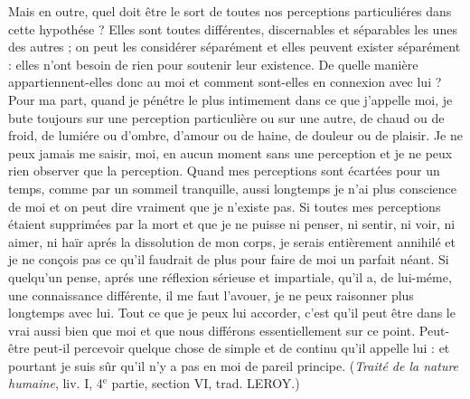 Mais en outre, quel doit être le sort de toutes nos perceptions
particuliéres dans cette hypothése ? Elles sont
toutes différentes, discernables et séparables les unes des
autres ; on peut les considérer séparément et elles peuvent
exister séparément : elles n’ont besoin de rien pour soutenir
leur existence. De quelle manière appartiennent-elles donc
au moi et comment sont-elles en connexion avec lui ?
Pour ma part, quand je pénétre le plus intimement dans
ce que j’appelle moi, je bute toujours sur une perception
particulière ou sur une autre, de chaud ou de froid, de
lumiére ou d’ombre, d’amour ou de haine, de douleur ou
de plaisir. Je ne peux jamais me saisir, moi, en aucun
moment sans une perception et je ne peux rien observer
que la perception. Quand mes perceptions sont écartées
pour un temps, comme par un sommeil tranquille, aussi
longtemps je n’ai plus conscience de moi et on peut dire
vraiment que je n’existe pas. Si toutes mes perceptions
étaient supprimées par la mort et que je ne puisse ni
penser, ni sentir, ni voir, ni aimer, ni haïr aprés la dissolution
de mon corps, je serais entièrement annihilé et
je ne conçois pas ce qu’il faudrait de plus pour faire de
moi un parfait néant. Si quelqu’un pense, aprés une réflexion
sérieuse et impartiale, qu’il a, de lui-méme, une
connaissance différente, il me faut l’avouer, je ne peux
raisonner plus longtemps avec lui. Tout ce que je peux
lui accorder, c’est qu’il peut être dans le vrai aussi bien
que moi et que nous différons essentiellement sur ce point.
Peut-être peut-il percevoir quelque chose de simple et de
continu qu’il appelle lui : et pourtant je suis sûr qu'il n’y
a pas en moi de pareil principe. ({\it Traité de la nature
humaine}, liv. I, 4$^\text{e}$ partie, section VI, trad. L{\footnotesize EROY}.)

